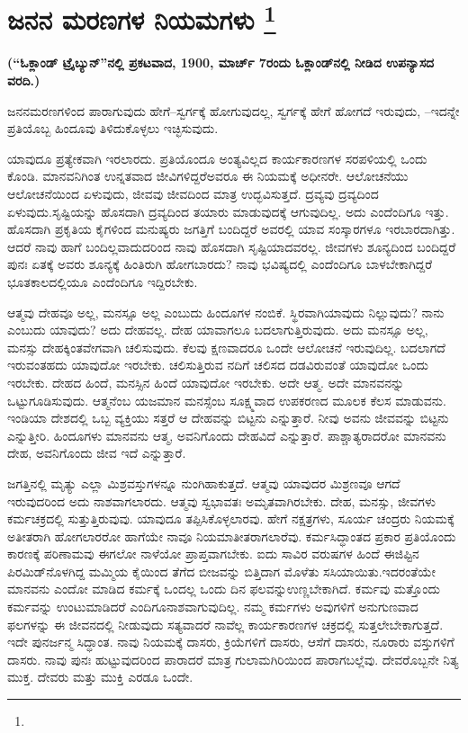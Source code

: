 
\chapter[ಜನನ ಮರಣಗಳ ನಿಯಮಗಳು ]{ಜನನ ಮರಣಗಳ ನಿಯಮಗಳು \protect\footnote{}}

\begin{center}
\textbf{(“ಓಕ್ಲಾಂಡ್​ ಟ್ರೈಬ್ಯುನ್​”ನಲ್ಲಿ ಪ್ರಕಟವಾದ, 1900, ಮಾರ್ಚ್​ 7ರಂದು ಓಕ್ಲಾಂಡ್​ನಲ್ಲಿ ನೀಡಿದ ಉಪನ್ಯಾಸದ ವರದಿ.)}
\end{center}

ಜನನಮರಣಗಳಿಂದ ಪಾರಾಗುವುದು ಹೇಗೆ–ಸ್ವರ್ಗಕ್ಕೆ ಹೋಗುವುದಲ್ಲ, ಸ್ವರ್ಗಕ್ಕೆ ಹೇಗೆ ಹೋಗದೆ ಇರುವುದು, –ಇದನ್ನೇ ಪ್ರತಿಯೊಬ್ಬ ಹಿಂದೂವು ತಿಳಿದುಕೊಳ್ಳಲು ಇಚ್ಛಿಸುವುದು.

ಯಾವುದೂ ಪ್ರತ್ಯೇಕವಾಗಿ ಇರಲಾರದು. ಪ್ರತಿಯೊಂದೂ ಅಂತ್ಯವಿಲ್ಲದ ಕಾರ್ಯಕಾರಣಗಳ ಸರಪಳಿಯಲ್ಲಿ ಒಂದು ಕೊಂಡಿ. ಮಾನವನಿಗಿಂತ ಉನ್ನತವಾದ ಜೀವಿಗಳಿದ್ದರೆ\break ಅವರೂ ಈ ನಿಯಮಕ್ಕೆ ಅಧೀನರೇ. ಆಲೋಚನೆಯು ಆಲೋಚನೆಯಿಂದ ಏಳುವುದು, ಜೀವವು ಜೀವದಿಂದ ಮಾತ್ರ ಉದ್ಭವಿಸುತ್ತದೆ. ದ್ರವ್ಯವು ದ್ರವ್ಯದಿಂದ ಏಳುವುದು.\break ಸೃಷ್ಟಿಯನ್ನು ಹೊಸದಾಗಿ ದ್ರವ್ಯದಿಂದ ತಯಾರು ಮಾಡುವುದಕ್ಕೆ ಆಗುವುದಿಲ್ಲ. ಅದು ಎಂದೆಂದಿಗೂ ಇತ್ತು. ಹೊಸದಾಗಿ ಪ್ರಕೃತಿಯ ಕೈಗಳಿಂದ ಮನುಷ್ಯರು ಜಗತ್ತಿಗೆ ಬಂದಿದ್ದರೆ ಅವರಲ್ಲಿ ಯಾವ ಸಂಸ್ಕಾರಗಳೂ ಇರಬಾರದಾಗಿತ್ತು. ಆದರೆ ನಾವು ಹಾಗೆ ಬಂದಿಲ್ಲವಾದುದರಿಂದ ನಾವು ಹೊಸದಾಗಿ ಸೃಷ್ಟಿಯಾದವರಲ್ಲ. ಜೀವಗಳು ಶೂನ್ಯದಿಂದ ಬಂದಿದ್ದರೆ ಪುನಃ ಏತಕ್ಕೆ ಅವರು ಶೂನ್ಯಕ್ಕೆ ಹಿಂತಿರುಗಿ ಹೋಗಬಾರದು? ನಾವು ಭವಿಷ್ಯದಲ್ಲಿ ಎಂದೆಂದಿಗೂ ಬಾಳಬೇಕಾಗಿದ್ದರೆ ಭೂತಕಾಲದಲ್ಲಿಯೂ ಎಂದೆಂದಿಗೂ ಇದ್ದಿರಬೇಕು.

ಆತ್ಮವು ದೇಹವೂ ಅಲ್ಲ, ಮನಸ್ಸೂ ಅಲ್ಲ ಎಂಬುದು ಹಿಂದೂಗಳ ನಂಬಿಕೆ. ಸ್ಥಿರವಾಗಿ\break ಯಾವುದು ನಿಲ್ಲುವುದು? ನಾನು ಎಂಬುದು ಯಾವುದು? ಅದು ದೇಹವಲ್ಲ. ದೇಹ ಯಾವಾಗಲೂ ಬದಲಾಗುತ್ತಿರುವುದು. ಅದು ಮನಸ್ಸೂ ಅಲ್ಲ, ಮನಸ್ಸು ದೇಹಕ್ಕಿಂತ\break ವೇಗವಾಗಿ ಚಲಿಸುವುದು. ಕೆಲವು ಕ್ಷಣವಾದರೂ ಒಂದೇ ಆಲೋಚನೆ ಇರುವುದಿಲ್ಲ. ಬದಲಾಗದೆ ಇರುವಂತಹದು ಯಾವುದೋ ಇರಬೇಕು. ಚಲಿಸುತ್ತಿರುವ ನದಿಗೆ ಚಲಿಸದ ದಡವಿರುವಂತೆ ಯಾವುದೋ ಒಂದು ಇರಬೇಕು. ದೇಹದ ಹಿಂದೆ, ಮನಸ್ಸಿನ ಹಿಂದೆ ಯಾವುದೋ ಇರಬೇಕು. ಅದೇ ಆತ್ಮ. ಅದೇ ಮಾನವನನ್ನು ಒಟ್ಟುಗೂಡಿಸುವುದು. ಆತ್ಮನೆಂಬ ಯಜಮಾನ ಮನಸ್ಸೆಂಬ ಸೂಕ್ಷ್ಮವಾದ ಉಪಕರಣದ ಮೂಲಕ ಕೆಲಸ ಮಾಡುವನು. ಇಂಡಿಯಾ ದೇಶದಲ್ಲಿ ಒಬ್ಬ ವ್ಯಕ್ತಿಯು ಸತ್ತರೆ ಆ ದೇಹವನ್ನು ಬಿಟ್ಟನು ಎನ್ನುತ್ತಾರೆ. ನೀವು ಅವನು ಜೀವವನ್ನು ಬಿಟ್ಟನು ಎನ್ನುತ್ತೀರಿ. ಹಿಂದೂಗಳು ಮಾನವನು ಆತ್ಮ, ಅವನಿಗೊಂದು ದೇಹವಿದೆ ಎನ್ನುತ್ತಾರೆ. ಪಾಶ್ಚಾತ್ಯರಾದರೋ ಮಾನವನು ದೇಹ, ಅವನಿಗೊಂದು ಜೀವ ಇದೆ ಎನ್ನುತ್ತಾರೆ.

ಜಗತ್ತಿನಲ್ಲಿ ಮೃತ್ಯು ಎಲ್ಲಾ ಮಿಶ್ರವಸ್ತುಗಳನ್ನೂ ನುಂಗಿಹಾಕುತ್ತದೆ. ಆತ್ಮವು ಯಾವುದರ ಮಿಶ್ರಣವೂ ಆಗದೆ ಇರುವುದರಿಂದ ಅದು ನಾಶವಾಗಲಾರದು. ಆತ್ಮವು ಸ್ವಭಾವತಃ ಅಮೃತವಾಗಿರಬೇಕು. ದೇಹ, ಮನಸ್ಸು, ಜೀವಗಳು ಕರ್ಮಚಕ್ರದಲ್ಲಿ ಸುತ್ತುತ್ತಿರುವುವು. ಯಾವುದೂ ತಪ್ಪಿಸಿಕೊಳ್ಳಲಾರವು. ಹೇಗೆ ನಕ್ಷತ್ರಗಳು, ಸೂರ್ಯ ಚಂದ್ರರು ನಿಯಮಕ್ಕೆ ಅತೀತರಾಗಿ ಹೋಗಲಾರರೋ ಹಾಗೆಯೇ ನಾವೂ ನಿಯಮಾತೀತರಾಗಲಾರೆವು. ಕರ್ಮಸಿದ್ಧಾಂತದ ಪ್ರಕಾರ ಪ್ರತಿಯೊಂದು ಕಾರಣಕ್ಕೆ ಪರಿಣಾಮವು ಈಗಲೋ ನಾಳೆಯೋ ಪ್ರಾಪ್ತವಾಗಬೇಕು. ಐದು ಸಾವಿರ ವರುಷಗಳ ಹಿಂದೆ ಈಜಿಪ್ಟಿನ ಪಿರಮಿಡ್​ನೊಳಗಿದ್ದ ಮಮ್ಮಿಯ ಕೈಯಿಂದ ತೆಗೆದ ಬೀಜವನ್ನು ಬಿತ್ತಿದಾಗ ಮೊಳೆತು ಸಸಿಯಾಯಿತು.\break ಇದರಂತೆಯೇ ಮಾನವನು ಎಂದೋ ಮಾಡಿದ ಕರ್ಮಕ್ಕೆ ಒಂದಲ್ಲ ಒಂದು ದಿನ ಫಲವನ್ನು\break ಉಣ್ಣಬೇಕಾಗಿದೆ. ಕರ್ಮವು ಮತ್ತೊಂದು ಕರ್ಮವನ್ನು ಉಂಟುಮಾಡಿದರೆ ಎಂದಿಗೂ\break ನಾಶವಾಗುವುದಿಲ್ಲ. ನಮ್ಮ ಕರ್ಮಗಳು ಅವುಗಳಿಗೆ ಅನುಗುಣವಾದ ಫಲಗಳನ್ನು ಈ ಜೀವನದಲ್ಲಿ ನೀಡುವುದು ಸತ್ಯವಾದರೆ ನಾವೆಲ್ಲ ಕಾರ್ಯಕಾರಣಗಳ ಚಕ್ರದಲ್ಲಿ ಸುತ್ತಲೇಬೇಕಾಗುತ್ತದೆ. ಇದೇ ಪುನರ್ಜನ್ಮ ಸಿದ್ಧಾಂತ. ನಾವು ನಿಯಮಕ್ಕೆ ದಾಸರು, ಕ್ರಿಯೆಗಳಿಗೆ ದಾಸರು, ಆಸೆಗೆ ದಾಸರು, ನೂರಾರು ವಸ್ತುಗಳಿಗೆ ದಾಸರು. ನಾವು ಪುನಃ ಹುಟ್ಟುವುದರಿಂದ ಪಾರಾದರೆ ಮಾತ್ರ ಗುಲಾಮಗಿರಿಯಿಂದ ಪಾರಾಗಬಲ್ಲೆವು. ದೇವರೊಬ್ಬನೇ ನಿತ್ಯ ಮುಕ್ತ. ದೇವರು ಮತ್ತು ಮುಕ್ತಿ ಎರಡೂ ಒಂದೇ.


